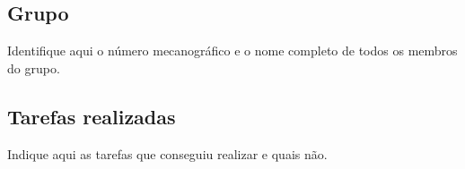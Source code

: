 \subsection*{Grupo}

Identifique aqui o número mecanográfico e o nome completo de todos os membros do grupo.

\subsection*{Tarefas realizadas}

Indique aqui as tarefas que conseguiu realizar e quais não. 